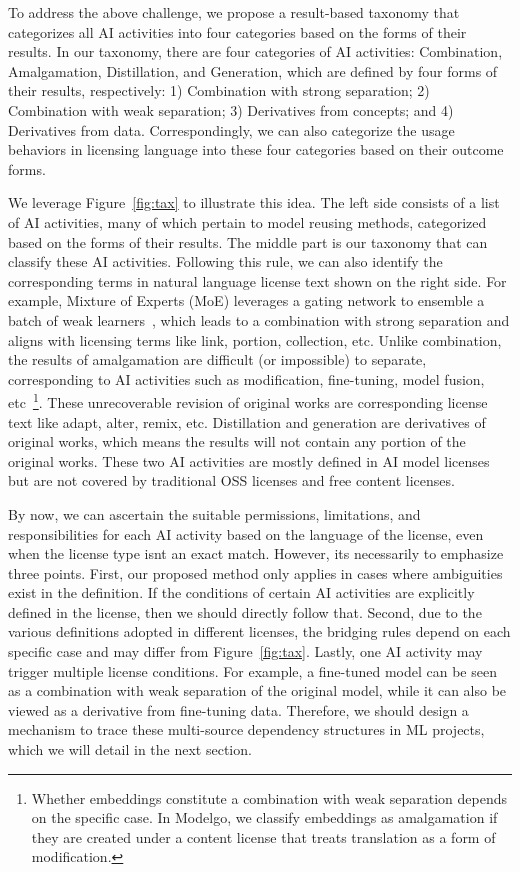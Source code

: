 To address the above challenge, we propose a result-based taxonomy that categorizes all AI activities into four categories based on the forms of their results. 
In our taxonomy, there are four categories of AI activities: Combination, Amalgamation, Distillation, and Generation, which are defined by four forms of their results, respectively: 1) Combination with strong separation; 2) Combination with weak separation; 3) Derivatives from concepts; and 4) Derivatives from data.
Correspondingly, we can also categorize the usage behaviors in licensing language into these four categories based on their outcome forms.

We leverage Figure~\ref{fig:tax} to illustrate this idea.
The left side consists of a list of AI activities, many of which pertain to model reusing methods, categorized based on the forms of their results.
The middle part is our taxonomy that can classify these AI activities.
Following this rule, we can also identify the corresponding terms in natural language license text shown on the right side.
For example, Mixture of Experts (MoE) leverages a gating network to ensemble a batch of weak learners~\cite{jacobs1991adaptive}, which leads to a combination with strong separation and aligns with licensing terms like link, portion, collection, etc.
Unlike combination, the results of amalgamation are difficult (or impossible) to separate, corresponding to AI activities such as modification, fine-tuning, model fusion, etc~\footnote{Whether embeddings constitute a combination with weak separation depends on the specific case. In Modelgo, we classify embeddings as amalgamation if they are created under a content license that treats translation as a form of modification.}. 
These unrecoverable revision of original works are corresponding license text like adapt, alter, remix, etc.
Distillation and generation are derivatives of original works, which means the results will not contain any portion of the original works. 
These two AI activities are mostly defined in AI model licenses but are not covered by traditional OSS licenses and free content licenses.

By now, we can ascertain the suitable permissions, limitations, and responsibilities for each AI activity based on the language of the license, even when the license type isnt an exact match.
However, its necessarily to emphasize three points.
First, our proposed method only applies in cases where ambiguities exist in the definition. 
If the conditions of certain AI activities are explicitly defined in the license, then we should directly follow that.
Second, due to the various definitions adopted in different licenses, the bridging rules depend on each specific case and may differ from Figure~\ref{fig:tax}.
Lastly, one AI activity may trigger multiple license conditions. For example, a fine-tuned model can be seen as a combination with weak separation of the original model, while it can also be viewed as a derivative from fine-tuning data.
Therefore, we should design a mechanism to trace these multi-source dependency structures in ML projects, which we will detail in the next section.
 
